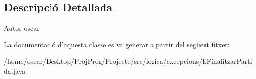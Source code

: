 \subsection{Descripció Detallada}
\begin{DoxyAuthor}{Autor}
oscar 
\end{DoxyAuthor}


La documentació d'aquesta classe es va generar a partir del següent fitxer\+:\begin{DoxyCompactItemize}
\item 
/home/oscar/\+Desktop/\+Proj\+Prog/\+Projecte/src/logica/excepcions/E\+Finalitzar\+Partida.\+java\end{DoxyCompactItemize}
